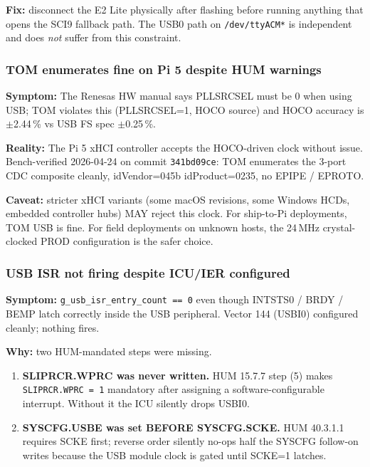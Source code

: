 \textbf{Fix:} disconnect the E2 Lite physically after flashing
before running anything that opens the SCI9 fallback path. The
USB0 path on \texttt{/dev/ttyACM*} is independent and does \emph{not}
suffer from this constraint.

\subsubsection{TOM enumerates fine on Pi 5 despite HUM warnings}

\textbf{Symptom:} The Renesas HW manual says PLLSRCSEL must be 0
when using USB; TOM violates this (PLLSRCSEL=1, HOCO source) and
HOCO accuracy is $\pm$2.44\,\% vs USB FS spec $\pm$0.25\,\%.

\textbf{Reality:} The Pi 5 xHCI controller accepts the HOCO-driven
clock without issue. Bench-verified 2026-04-24 on commit
\texttt{341bd09ce}: TOM enumerates the 3-port CDC composite
cleanly, idVendor=045b idProduct=0235, no EPIPE / EPROTO.

\textbf{Caveat:} stricter xHCI variants (some macOS revisions,
some Windows HCDs, embedded controller hubs) MAY reject this clock.
For ship-to-Pi deployments, TOM USB is fine. For field deployments
on unknown hosts, the 24\,MHz crystal-clocked PROD configuration
is the safer choice.

\subsubsection{USB ISR not firing despite ICU/IER configured}

\textbf{Symptom:} \texttt{g\_usb\_isr\_entry\_count == 0} even
though INTSTS0 / BRDY / BEMP latch correctly inside the USB peripheral.
Vector 144 (USBI0) configured cleanly; nothing fires.

\textbf{Why:} two HUM-mandated steps were missing.

\begin{enumerate}
  \item \textbf{SLIPRCR.WPRC was never written.} HUM 15.7.7 step (5)
        makes \texttt{SLIPRCR.WPRC = 1} mandatory after assigning a
        software-configurable interrupt. Without it the ICU silently
        drops USBI0.
  \item \textbf{SYSCFG.USBE was set BEFORE SYSCFG.SCKE.} HUM
        40.3.1.1 requires SCKE first; reverse order silently no-ops
        half the SYSCFG follow-on writes because the USB module
        clock is gated until SCKE=1 latches.
\end{enumerate}

